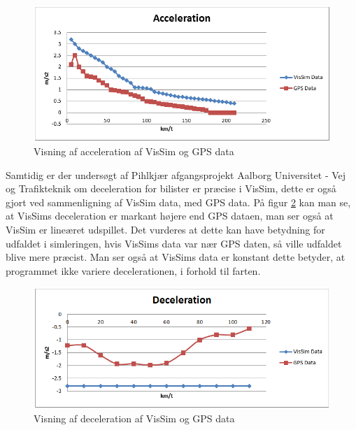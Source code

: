 \begin{figure}
\begin{center}
\includegraphics[width=1.0\textwidth]{Pictures/Teknologianalyse/GrafForAccelerationVisSimGPS.png}
\end{center}
\label{GrafForAccelerationVisSimGPS}
\caption{Visning af acceleration af VisSim og GPS data}
\end{figure}

Samtidig er der undersøgt af Pihlkjær afgangsprojekt Aalborg Universitet - Vej og Trafikteknik om deceleration for bilister er præcise i VisSim, dette er også gjort ved sammenligning af VisSim data, med GPS data. På figur \ref{GrafForDecelerationVisSimGPS} kan man se, at VisSims deceleration er markant højere end GPS dataen, man ser også at VisSim er lineæret udspillet. Det vurderes at dette kan have betydning for udfaldet i simleringen, hvis VisSims data var nær GPS daten, så ville udfaldet blive mere præcist. Man ser også at VisSims data er konstant dette betyder, at programmet ikke variere decelerationen, i forhold til farten. 

\begin{figure}
\begin{center}
\includegraphics[width=1.0\textwidth]{Pictures/Teknologianalyse/GrafForDecelerationVisSimGPS.png}
\end{center}
\label{GrafForDecelerationVisSimGPS}
\caption{Visning af deceleration af VisSim og GPS data}
\end{figure}


